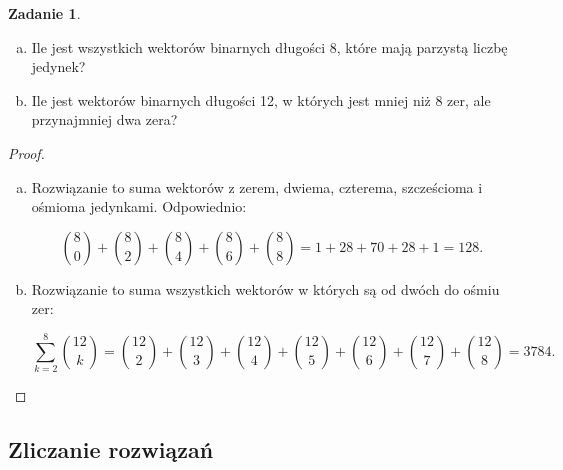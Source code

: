 \documentclass[11pt]{article}
\theoremstyle{definition}
\newtheorem{zadanie}{Zadanie}
\numberwithin{zadanie}{subsection}
\begin{document}
\begin{zadanie}
    \begin{enumerate}[a)]
        \item Ile jest wszystkich wektorów binarnych długości 8, które mają parzystą liczbę jedynek?
        \item Ile jest wektorów binarnych długości 12, w których jest mniej niż 8 zer, ale przynajmniej dwa zera?
    \end{enumerate}
\end{zadanie}
\begin{proof}
    \begin{enumerate}[a)]
        \item Rozwiązanie to suma wektorów z zerem, dwiema, czterema, szcześcioma i ośmioma jedynkami. Odpowiednio:

              $$\binom80+\binom82+\binom84+\binom86+\binom88 = 1+28+70+28+1 = 128.$$

        \item Rozwiązanie to suma wszystkich wektorów w których są od dwóch do ośmiu zer:

              $$\sum_{k=2}^8\binom{12}{k} = \binom{12}{2}+\binom{12}{3}+\binom{12}{4}+\binom{12}{5}+\binom{12}{6}+\binom{12}{7}+\binom{12}{8} = 3784.$$
    \end{enumerate}
\end{proof}


\subsection{Zliczanie rozwiązań}
\end{document}
